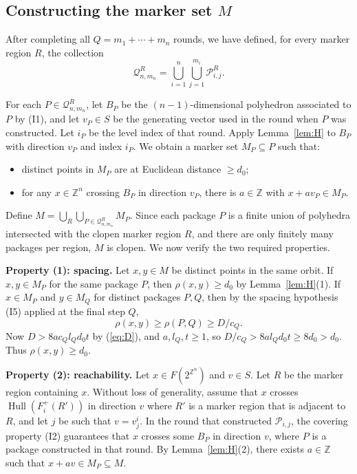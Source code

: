 \documentclass{amsart}
\theoremstyle{definition}
\DeclareMathOperator{\Hull}{Hull}
\begin{document}
\subsection{Constructing the marker set $M$}

After completing all $Q=m_1+\cdots+m_n$ rounds, we have defined, for
every marker region $R$, the collection
\[
\mathcal{Q}_{n,m_n}^R=
\bigcup_{i=1}^n\bigcup_{j=1}^{m_i}\mathcal{P}_{i,j}^R.
\]

For each $P\in\mathcal{Q}_{n,m_n}^R$, let $B_P$ be the $(n-1)$-dimensional
polyhedron associated to $P$ by (I1), and let $v_P\in S$ be the generating
vector used in the round when $P$ was constructed. Let $i_P$ be the level
index of that round. Apply Lemma~\ref{lem:H} to $B_P$ with direction $v_P$
and index $i_P$. We obtain a marker set $M_P\subseteq P$ such that:
\begin{itemize}
\item distinct points in $M_P$ are at Euclidean distance $\geq d_0$;
\item for any $x\in\mathbb{Z}^n$ crossing $B_P$ in direction $v_P$,
there is $a\in\mathbb{Z}$ with $x+av_P\in M_P$.
\end{itemize}

Define
$M=\bigcup_{R}\bigcup_{P\in\mathcal{Q}_{n,m_n}^R} M_P$.
Since each package $P$ is a finite union of polyhedra intersected with the
clopen marker region $R$, and there are only finitely many packages per
region, $M$ is clopen. We now verify the two required properties.

\medskip\noindent
\textbf{Property (1): spacing.}
Let $x,y\in M$ be distinct points in the same orbit. If $x,y\in M_P$ for
the same package $P$, then $\rho(x,y)\geq d_0$ by Lemma~\ref{lem:H}(1).
If $x\in M_P$ and $y\in M_Q$ for distinct packages $P,Q$, then by the
spacing hypothesis (I5) applied at the final step $Q$,
\[
\rho(x,y)\geq \rho(P,Q)\geq D/c_Q.
\]
Now $D>8a c_Q l_Q d_0 t$ by (\ref{eq:D}), and $a, l_Q, t\geq 1$, so
$D/c_Q > 8a l_Q d_0 t \geq 8d_0 > d_0$. Thus $\rho(x,y)\geq d_0$.

\medskip\noindent
\textbf{Property (2): reachability.}
Let $x\in F(2^{\mathbb{Z}^n})$ and $v\in S$. Let $R$ be the marker region
containing $x$. Without loss of generality, assume that $x$ crosses $\Hull(F^+_i(R'))$ in direction $v$ where $R'$ is a marker region that is adjacent to $R$, and let
$j$ be such that $v=v_j^i$. In the round that constructed
$\mathcal{P}_{i,j}$, the covering property (I2) guarantees that $x$
crosses some $B_P$ in direction $v$, where $P$ is a package constructed
in that round. By
Lemma~\ref{lem:H}(2), there exists $a\in\mathbb{Z}$ such that
$x+av\in M_P\subseteq M$.
\end{document}
